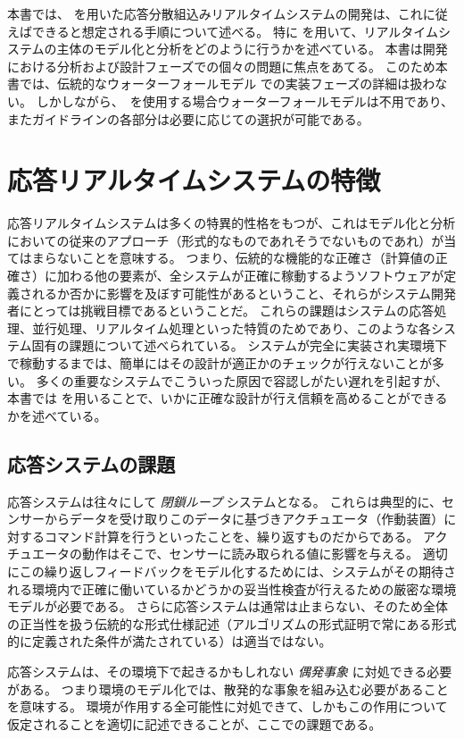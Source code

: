 \documentclass[\pformat,12pt]{jreport}
\begin{document}
本書では、 \VDMTools を用いた応答分散組込みリアルタイムシステムの開発は、これに従えばできると想定される手順について述べる。
特に \VDMTools を用いて、リアルタイムシステムの主体のモデル化と分析をどのように行うかを述べている。
本書は開発における分析および設計フェーズでの個々の問題に焦点をあてる。
このため本書では、伝統的なウォーターフォールモデル \cite{Royce70}での実装フェーズの詳細は扱わない。
しかしながら、\VDMTools\ を使用する場合ウォーターフォールモデルは不用であり、またガイドラインの各部分は必要に応じての選択が可能である。

\section{応答リアルタイムシステムの特徴}

応答リアルタイムシステムは多くの特異的性格をもつが、これはモデル化と分析においての従来のアプローチ（形式的なものであれそうでないものであれ）が当てはまらないことを意味する。
つまり、伝統的な機能的な正確さ（計算値の正確さ）に加わる他の要素が、全システムが正確に稼動するようソフトウェアが定義されるか否かに影響を及ぼす可能性があるということ、それらがシステム開発者にとっては挑戦目標であるということだ。
これらの課題はシステムの応答処理、並行処理、リアルタイム処理といった特質のためであり、このような各システム固有の課題について述べられている。
システムが完全に実装され実環境下で稼動するまでは、簡単にはその設計が適正かのチェックが行えないことが多い。
多くの重要なシステムでこういった原因で容認しがたい遅れを引起すが、本書では \VDMTools を用いることで、いかに正確な設計が行え信頼を高めることができるかを述べている。

\subsection{応答システムの課題}

応答システムは往々にして \emph{閉鎖ループ} システムとなる。
これらは典型的に、センサーからデータを受け取りこのデータに基づきアクチュエータ（作動装置）に対するコマンド計算を行うといったことを、繰り返すものだからである。
アクチュエータの動作はそこで、センサーに読み取られる値に影響を与える。
適切にこの繰り返しフィードバックをモデル化するためには、システムがその期待される環境内で正確に働いているかどうかの妥当性検査が行えるための厳密な環境モデルが必要である。
さらに応答システムは通常は止まらない、そのため全体の正当性を扱う伝統的な形式仕様記述（アルゴリズムの形式証明で常にある形式的に定義された条件が満たされている）は適当ではない。

応答システムは、その環境下で起きるかもしれない \emph{偶発事象} に対処できる必要がある。
つまり環境のモデル化では、散発的な事象を組み込む必要があることを意味する。
環境が作用する全可能性に対処できて、しかもこの作用について仮定されることを適切に記述できることが、ここでの課題である。
\end{document}
